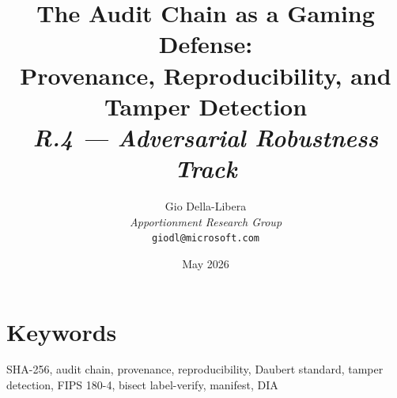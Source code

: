 \documentclass[12pt]{article}
\title{%
  \textbf{The Audit Chain as a Gaming Defense:\\
  Provenance, Reproducibility, and Tamper Detection}\\[0.8em]
  \normalsize\textit{R.4 --- Adversarial Robustness Track}%
}
\author{%
  Gio Della-Libera\\
  \textit{Apportionment Research Group}\\
  \small\texttt{giodl@microsoft.com}
}
\date{May 2026}
\begin{document}
\maketitle

\begin{abstract}

\end{abstract}

\section*{Keywords}
SHA-256, audit chain, provenance, reproducibility, Daubert standard,
tamper detection, FIPS 180-4, bisect label-verify, manifest, DIA

\tableofcontents
\newpage











\end{document}

